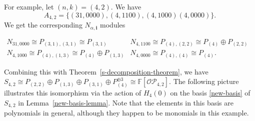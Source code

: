 \documentclass[ALCO,ThmDefs,published]{cedram}
\newcommand{\FF}{{\mathbb{F}}}
\theoremstyle{plain}
\newcommand{\OP}{{\mathcal{OP}}}
\newcommand{\FF}{{\mathbb{F}}}
\newcommand{\ii}{{\mathbf{i}}}
\begin{document}
For example, let $(n,k) = (4,2)$.  We have 
\[
A_{4,2} = \{ (31, 0000 ), ( 4, 1100 ), ( 4, 1000 )( 4, 0000 ) \}.
\]
We get the corresponding $N_{\alpha,\ii}$ modules 
\begin{center}
$\begin{array}{cc}
N_{31,0000} \cong P_{(3,1),(3,1)} \cong P_{(3,1)} & N_{4,1100} \cong P_{(4),(2,2)} \cong P_{(4)} \oplus P_{(2,2)} \\
N_{4,1000} \cong P_{(4),(1,3)} \cong P_{(4)} \oplus P_{(1,3)} & 
N_{4,0000} \cong P_{(4),(4)} \cong P_{(4)}.
\end{array}$
\end{center}
Combining this with Theorem~\ref{s-decomposition-theorem}, 
we have $S_{4,2} \cong P_{(2,2)} \oplus P_{(1,3)} \oplus P_{(3,1)} \oplus P_{(4)}^{\oplus 3} \cong \FF[\OP_{4,2}]$. 
The following picture illustrates this isomorphism via the action of $H_4(0)$ on the basis \eqref{new-basis} of $S_{4,2}$ in
Lemma~\ref{new-basis-lemma}.
Note that the elements in this basis are polynomials in general, although they happen to be monomials in this example.
\end{document}

